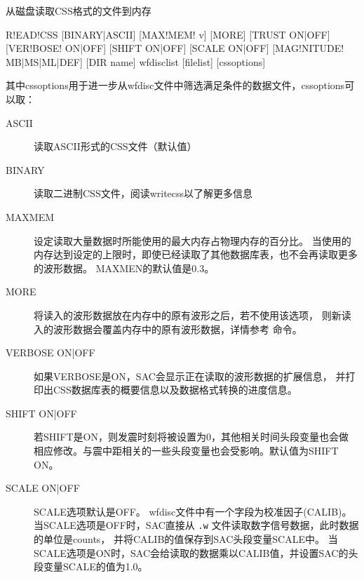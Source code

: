 \label{cmd:readcss}

从磁盘读取CSS格式的文件到内存

\begin{SACSTX}
R!EAD!CSS [BINARY|ASCII] [MAX!MEM! v] [MORE] [TRUST ON|OFF]
    [VER!BOSE! ON|OFF] [SHIFT ON|OFF] [SCALE ON|OFF]
    [MAG!NITUDE! MB|MS|ML|DEF] [DIR name] wfdisclist [filelist]
    [cssoptions]
\end{SACSTX}
其中cssoptions用于进一步从wfdisc文件中筛选满足条件的数据文件，cssoptions可以取：
\begin{SACSTX}
\end{SACSTX}

\begin{description}
\item [ASCII] 读取ASCII形式的CSS文件（默认值）
\item [BINARY] 读取二进制CSS文件，阅读writecss以了解更多信息
\item [MAXMEM] 设定读取大量数据时所能使用的最大内存占物理内存的百分比。
    当使用的内存达到设定的上限时，即使已经读取了其他数据库表，也不会再读取更多的波形数据。
    MAXMEN的默认值是0.3。
\item [MORE] 将读入的波形数据放在内存中的原有波形之后，若不使用该选项，
    则新读入的波形数据会覆盖内存中的原有波形数据，详情参考  命令。
\item [VERBOSE ON|OFF] 如果VERBOSE是ON，SAC会显示正在读取的波形数据的扩展信息，
    并打印出CSS数据库表的概要信息以及数据格式转换的进度信息。
\item [SHIFT ON|OFF] 若SHIFT是ON，则发震时刻将被设置为0，其他相关时间头段变量也会做
    相应修改。与震中距相关的一些头段变量也会受影响。默认值为SHIFT ON。
\item [SCALE ON|OFF] SCALE选项默认是OFF。
    wfdisc文件中有一个字段为校准因子(CALIB)。
    当SCALE选项是OFF时，SAC直接从 \texttt{.w} 文件读取数字信号数据，此时数据的单位是counts，
    并将CALIB的值保存到SAC头段变量SCALE中。
    当SCALE选项是ON时，SAC会给读取的数据乘以CALIB值，并设置SAC的头段变量SCALE的值为1.0。

\end{description}
